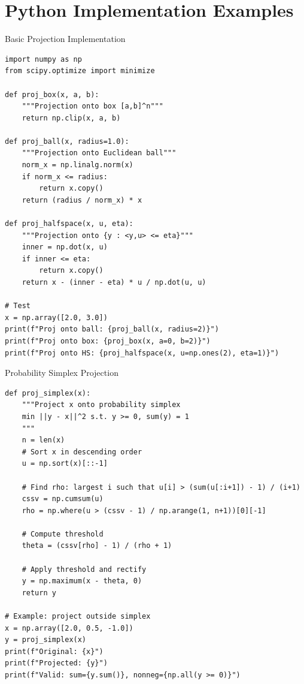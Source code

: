 \documentclass[aspectratio=169,10pt]{beamer}
\begin{document}
\section{Python Implementation Examples}

\begin{frame}[fragile]{Basic Projection Implementation}

    \begin{lstlisting}
import numpy as np
from scipy.optimize import minimize

def proj_box(x, a, b):
    """Projection onto box [a,b]^n"""
    return np.clip(x, a, b)

def proj_ball(x, radius=1.0):
    """Projection onto Euclidean ball"""
    norm_x = np.linalg.norm(x)
    if norm_x <= radius:
        return x.copy()
    return (radius / norm_x) * x

def proj_halfspace(x, u, eta):
    """Projection onto {y : <y,u> <= eta}"""
    inner = np.dot(x, u)
    if inner <= eta:
        return x.copy()
    return x - (inner - eta) * u / np.dot(u, u)

# Test
x = np.array([2.0, 3.0])
print(f"Proj onto ball: {proj_ball(x, radius=2)}")
print(f"Proj onto box: {proj_box(x, a=0, b=2)}")
print(f"Proj onto HS: {proj_halfspace(x, u=np.ones(2), eta=1)}")
    \end{lstlisting}

\end{frame}

\begin{frame}[fragile]{Probability Simplex Projection}

    \begin{lstlisting}
def proj_simplex(x):
    """Project x onto probability simplex
    min ||y - x||^2 s.t. y >= 0, sum(y) = 1
    """
    n = len(x)
    # Sort x in descending order
    u = np.sort(x)[::-1]

    # Find rho: largest i such that u[i] > (sum(u[:i+1]) - 1) / (i+1)
    cssv = np.cumsum(u)
    rho = np.where(u > (cssv - 1) / np.arange(1, n+1))[0][-1]

    # Compute threshold
    theta = (cssv[rho] - 1) / (rho + 1)

    # Apply threshold and rectify
    y = np.maximum(x - theta, 0)
    return y

# Example: project outside simplex
x = np.array([2.0, 0.5, -1.0])
y = proj_simplex(x)
print(f"Original: {x}")
print(f"Projected: {y}")
print(f"Valid: sum={y.sum()}, nonneg={np.all(y >= 0)}")
    \end{lstlisting}

\end{frame}
\end{document}
